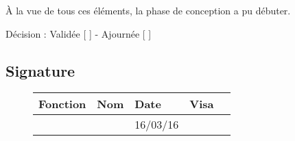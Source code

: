 \documentclass[asi, sansVersion]{picInsa}
\begin{document}
À la vue de tous ces éléments, la phase de conception a pu débuter.

\begin{center}
Décision : Validée [ \checkmark{} ] - Ajournée [ ]
\end{center}

\subsection*{Signature}
\begin{figure}[H]
		\centering
		\begin{tabularx}{17cm}{|p{4cm}|X|X|X|X|}
		\hline
		\rowcolor[gray]{0.85} Fonction & Nom & Date & Visa \\
		\hline
		\CP{} & \Sergi{} & 16/03/16 & \\
		\hline
		\end{tabularx}
\end{figure}
\end{document}
